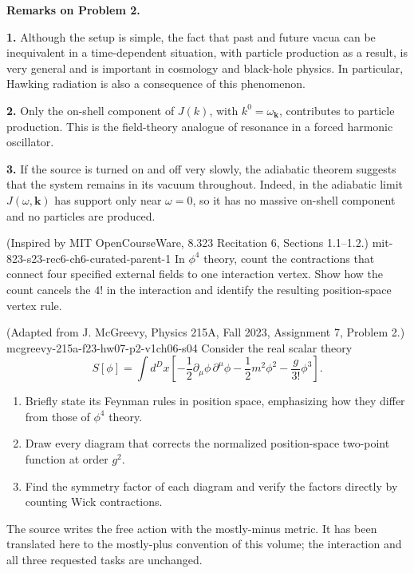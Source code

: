 \begin{enumerate}
\medskip
\noindent\textbf{Remarks on Problem 2.}\par\smallskip
\noindent\textbf{1.}
Although the setup is simple, the fact that past and future vacua can be
inequivalent in a time-dependent situation, with particle production as a
result, is very general and is important in cosmology and black-hole physics.
In particular, Hawking radiation is also a consequence of this phenomenon.

\noindent\textbf{2.}
Only the on-shell component of \(J(k)\), with
\(k^0=\omega_{\mathbf k}\), contributes to particle production.  This is the
field-theory analogue of resonance in a forced harmonic oscillator.

\noindent\textbf{3.}
If the source is turned on and off very slowly, the adiabatic theorem suggests
that the system remains in its vacuum throughout.  Indeed, in the adiabatic
limit \(J(\omega,\mathbf k)\) has support only near \(\omega=0\), so it has no
massive on-shell component and no particles are produced.

  {(Inspired by MIT OpenCourseWare, 8.323 Recitation 6, Sections 1.1--1.2.)}
  {mit-823-s23-rec6-ch6-curated-parent-1}
In \(\phi^4\) theory, count the contractions that connect four specified
external fields to one interaction vertex.  Show how the count cancels
the \(4!\) in the interaction and identify the resulting position-space
vertex rule.

  {(Adapted from J. McGreevy, Physics 215A, Fall 2023, Assignment 7, Problem 2.)}
  {mcgreevy-215a-f23-hw07-p2-v1ch06-s04}
Consider the real scalar theory
\[
 S[\phi]=\int d^Dx\left[
 -\frac12\partial_\mu\phi\,\partial^\mu\phi
 -\frac12m^2\phi^2-\frac{g}{3!}\phi^3
 \right].
\]
\begin{enumerate}
\item Briefly state its Feynman rules in position space, emphasizing how
they differ from those of \(\phi^4\) theory.
\item Draw every diagram that corrects the normalized position-space
two-point function at order \(g^2\).
\item Find the symmetry factor of each diagram and verify the factors
directly by counting Wick contractions.
\end{enumerate}
The source writes the free action with the mostly-minus metric.  It has been
translated here to the mostly-plus convention of this volume; the
interaction and all three requested tasks are unchanged.


\end{enumerate}

